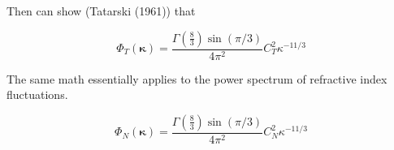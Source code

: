 \documentclass{article}
\begin{document}
Then can show (Tatarski (1961)) that

\begin{equation}
    \Phi_T(\bm{\kappa}) = \frac{\Gamma(\frac{8}{3})\sin(\pi/3)}{4 \pi^2} C^2_T \kappa^{-11/3}
\end{equation}

The same math essentially applies to the power spectrum of refractive index fluctuations.

\begin{equation}
    \Phi_N(\bm{\kappa}) = \frac{\Gamma(\frac{8}{3})\sin(\pi/3)}{4 \pi^2} C^2_N \kappa^{-11/3}
\end{equation}
\end{document}
